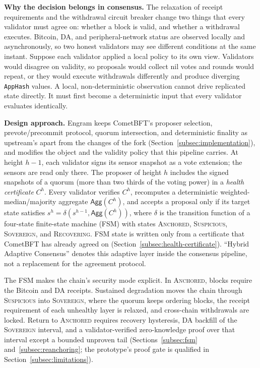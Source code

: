 \textbf{Why the decision belongs in consensus.} The relaxation of receipt
requirements and the withdrawal circuit breaker change two things that every
validator must agree on: whether a block is valid, and whether a withdrawal
executes. Bitcoin, DA, and peripheral-network status are observed locally and
asynchronously, so two honest validators may see different conditions at the
same instant. Suppose each validator applied a local policy to its own view.
Validators would disagree on validity, so proposals would collect nil votes and
rounds would repeat, or they would execute withdrawals differently and produce
diverging \texttt{AppHash} values. A local, non-deterministic observation
cannot drive replicated state directly. It must first become a deterministic
input that every validator evaluates identically.

\textbf{Design approach.} Engram keeps CometBFT's proposer selection,
prevote/precommit protocol, quorum intersection, and deterministic finality
as upstream's apart from the changes of the fork (Section~\ref{subsec:implementation}), and modifies the object and the validity policy that this pipeline
carries. At height $h{-}1$, each validator signs its sensor snapshot as a vote
extension; the sensors are read only there. The proposer of height $h$ includes
the signed snapshots of a quorum (more than two thirds of the voting power) in a \emph{health
certificate} $C^{h}$. Every validator verifies $C^{h}$, recomputes a
deterministic weighted-median/majority aggregate $\mathsf{Agg}(C^{h})$, and
accepts a proposal only if its target state satisfies
$s^{h} = \delta(s^{h-1}, \mathsf{Agg}(C^{h}))$, where $\delta$ is the
transition function of a four-state finite-state machine (FSM) with states
\textsc{Anchored}, \textsc{Suspicious}, \textsc{Sovereign}, and
\textsc{Recovering}. FSM state is written only from a certificate that
CometBFT has already agreed on (Section~\ref{subsec:health-certificate}).
``Hybrid Adaptive Consensus'' denotes this adaptive layer inside the
consensus pipeline, not a replacement for the agreement protocol.

The FSM makes the chain's security mode explicit. In \textsc{Anchored}, blocks
require the Bitcoin and DA receipts. Sustained degradation moves the chain
through \textsc{Suspicious} into \textsc{Sovereign}, where the quorum keeps
ordering blocks, the receipt requirement of each unhealthy layer is relaxed,
and cross-chain withdrawals are locked. Return to \textsc{Anchored} requires
recovery hysteresis, DA backfill of the \textsc{Sovereign} interval, and a
validator-verified zero-knowledge proof over that interval except a bounded unproven tail
(Sections~\ref{subsec:fsm} and~\ref{subsec:reanchoring}; the prototype's proof
gate is qualified in Section~\ref{subsec:limitations}).

